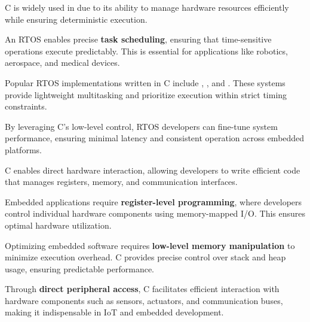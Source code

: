 \begin{NxSSSSBox}
	\begin{NxIDBox}
		C is widely used in  due to its ability to manage hardware resources efficiently while ensuring deterministic execution.
	\end{NxIDBox}
	\begin{NxIDBox}
		An RTOS enables precise \textbf{task scheduling}, ensuring that time-sensitive operations execute predictably. This is essential for applications like robotics, aerospace, and medical devices.
	\end{NxIDBox}
	\begin{NxIDBox}
Popular RTOS implementations written in C include , , and . These systems provide lightweight multitasking and prioritize execution within strict timing constraints.
	\end{NxIDBox}
	\begin{NxIDBox}
		By leveraging C’s low-level control, RTOS developers can fine-tune system performance, ensuring minimal latency and consistent operation across embedded platforms.
	\end{NxIDBox}
\end{NxSSSSBox}

\begin{NxSSSSBox}
	\begin{NxIDBox}
		C enables direct hardware interaction, allowing developers to write efficient code that manages registers, memory, and communication interfaces.
	\end{NxIDBox}
	\begin{NxIDBox}
		Embedded applications require \textbf{register-level programming}, where developers control individual hardware components using memory-mapped I/O. This ensures optimal hardware utilization.
	\end{NxIDBox}
	\begin{NxIDBox}
		Optimizing embedded software requires \textbf{low-level memory manipulation} to minimize execution overhead. C provides precise control over stack and heap usage, ensuring predictable performance.
	\end{NxIDBox}
	\begin{NxIDBox}
		Through \textbf{direct peripheral access}, C facilitates efficient interaction with hardware components such as sensors, actuators, and communication buses, making it indispensable in IoT and embedded development.
	\end{NxIDBox}
\end{NxSSSSBox}

